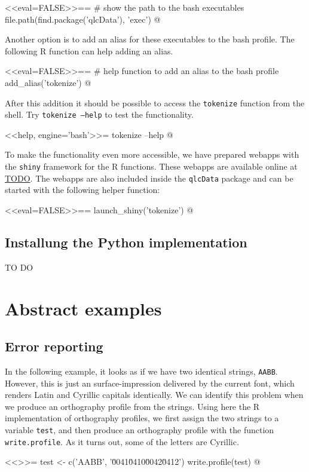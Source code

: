 <<eval=FALSE>>==
# show the path to the bash executables
file.path(find.package('qlcData'), 'exec')
@

\noindent Another option is to add an alias for these executables to the bash
profile. The following R function can help adding an alias. 

<<eval=FALSE>>==
# help function to add an alias to the bash profile
add_alias('tokenize')
@

After this addition
it should be possible to access the \texttt{tokenize} function from the shell.
Try \texttt{tokenize --help} to test the functionality.

<<help, engine='bash'>>=
tokenize --help
@

To make the functionality even more accessible, we have prepared webapps with 
the \texttt{shiny} framework for the R functions. These webapps are available 
online at \url{TODO}. The webapps are also included inside the \texttt{qlcData} 
package and can be started with the following helper function:

<<eval=FALSE>>==
launch_shiny('tokenize')
@

\subsection*{Installung the Python implementation}

TO DO

\section{Abstract examples}

\subsection*{Error reporting}

In the following example, it looks as if we have two identical strings,
\texttt{AABB}. However, this is just an surface-impression delivered by the
current font, which renders Latin and Cyrillic capitals identically. We can
identify this problem when we produce an orthography profile from the strings.
Using here the R implementation of orthography profiles, we first assign the two
strings to a variable \texttt{test}, and then produce an orthography profile
with the function \texttt{write.profile}. As it turns out, some of the letters 
are Cyrillic.

<<>>=
test <- c('AABB', '\u0041\u0410\u0042\u0412')
write.profile(test)
@

